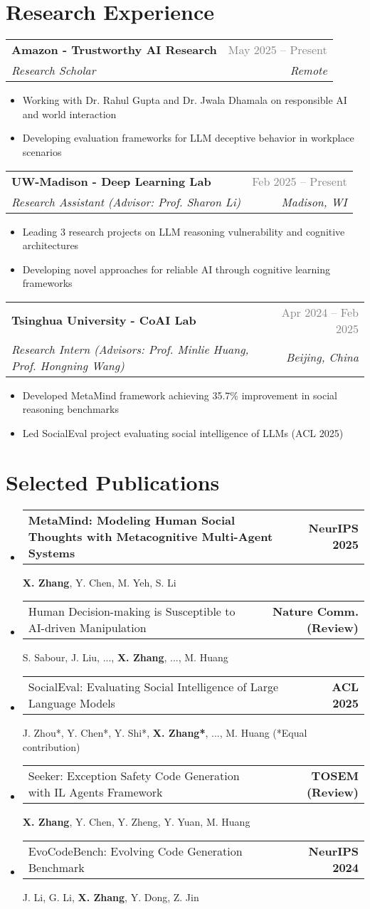 \documentclass[11pt,letterpaper]{article}
\makeatletter
\newcommand{\resumeItem}[1]{
  \item\small{#1}
}
\newcommand{\resumeSubheading}[4]{
  \vspace{-2pt}\item
    \begin{tabular*}{\textwidth}[t]{l@{\extracolsep{\fill}}r}
      \textbf{\color{dark}#1} & \textcolor{gray}{#2} \\
      \textit{\color{secondary}#3} & \textit{\color{gray}#4} \\
    \end{tabular*}\vspace{-7pt}
}
\newcommand{\resumePublication}[2]{
  \vspace{-2pt}\item
    \begin{tabular*}{\textwidth}[t]{l@{\extracolsep{\fill}}r}
      \small#1 & \textcolor{primary}{\small#2} \\
    \end{tabular*}\vspace{-7pt}
}
\makeatother
\begin{document}
\section{Research Experience}
\resumeSubHeadingListStart
  \resumeSubheading
    {Amazon - Trustworthy AI Research}{May 2025 -- Present}
    {Research Scholar}{Remote}
    \begin{itemize}
      \resumeItem{Working with Dr. Rahul Gupta and Dr. Jwala Dhamala on responsible AI and world interaction}
      \resumeItem{Developing evaluation frameworks for LLM deceptive behavior in workplace scenarios}
    \end{itemize}
    
  \resumeSubheading
    {UW-Madison - Deep Learning Lab}{Feb 2025 -- Present}
    {Research Assistant (Advisor: Prof. Sharon Li)}{Madison, WI}
    \begin{itemize}
      \resumeItem{Leading 3 research projects on LLM reasoning vulnerability and cognitive architectures}
      \resumeItem{Developing novel approaches for reliable AI through cognitive learning frameworks}
    \end{itemize}
    
  \resumeSubheading
    {Tsinghua University - CoAI Lab}{Apr 2024 -- Feb 2025}
    {Research Intern (Advisors: Prof. Minlie Huang, Prof. Hongning Wang)}{Beijing, China}
    \begin{itemize}
      \resumeItem{Developed MetaMind framework achieving 35.7\% improvement in social reasoning benchmarks}
      \resumeItem{Led SocialEval project evaluating social intelligence of LLMs (ACL 2025)}
    \end{itemize}
\resumeSubHeadingListEnd

\section{Selected Publications}
\begin{itemize}[leftmargin=0.15in, label={}]
  \resumePublication
    {\textbf{MetaMind: Modeling Human Social Thoughts with Metacognitive Multi-Agent Systems}}{\textbf{NeurIPS 2025}}
    \small{\textbf{X. Zhang}, Y. Chen, M. Yeh, S. Li}
    
  \resumePublication
    {Human Decision-making is Susceptible to AI-driven Manipulation}{\textbf{Nature Comm. (Review)}}
    \small{S. Sabour, J. Liu, ..., \textbf{X. Zhang}, ..., M. Huang}
    
  \resumePublication
    {SocialEval: Evaluating Social Intelligence of Large Language Models}{\textbf{ACL 2025}}
    \small{J. Zhou*, Y. Chen*, Y. Shi*, \textbf{X. Zhang*}, ..., M. Huang (*Equal contribution)}
    
  \resumePublication
    {Seeker: Exception Safety Code Generation with IL Agents Framework}{\textbf{TOSEM (Review)}}
    \small{\textbf{X. Zhang}, Y. Chen, Y. Zheng, Y. Yuan, M. Huang}
    
  \resumePublication
    {EvoCodeBench: Evolving Code Generation Benchmark}{\textbf{NeurIPS 2024}}
    \small{J. Li, G. Li, \textbf{X. Zhang}, Y. Dong, Z. Jin}
\end{itemize}
\end{document}
